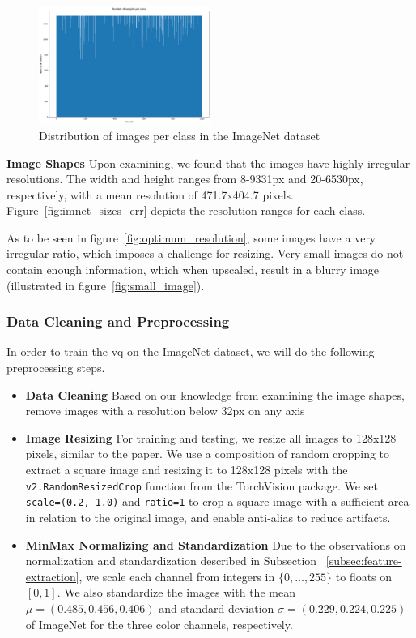 \begin{figure}[ht]
    \centering
    \includegraphics[width=0.5\textwidth]{../../sample_images/imagenet_dist}
    \caption{Distribution of images per class in the ImageNet dataset}
    \label{fig:imnet_dist}
\end{figure}

\textbf{Image Shapes}
Upon examining, we found that the images have highly irregular resolutions.
The width and height ranges from 8-9331px and 20-6530px, respectively, with a mean resolution of 471.7x404.7 pixels.
Figure~\ref{fig:imnet_sizes_err} depicts the resolution ranges for each class.

As to be seen in figure~\ref{fig:optimum_resolution}, some images have a very irregular ratio, which imposes a challenge
for resizing.
Very small images do not contain enough information, which when upscaled, result in a blurry image (illustrated in
figure~\ref{fig:small_image}).

\subsubsection{Data Cleaning and Preprocessing}
In order to train the \ac{vq} on the ImageNet dataset, we will do the following preprocessing steps.

\begin{itemize}
    \item \textbf{Data Cleaning}
    Based on our knowledge from examining the image shapes, remove images with a resolution below 32px on any axis
    \item \textbf{Image Resizing}
    For training and testing, we resize all images to 128x128 pixels, similar to the paper.
    We use a composition of random cropping to extract a square image and resizing it to 128x128 pixels with
    the \texttt{v2.RandomResizedCrop} function from the TorchVision package.
    We set \texttt{scale=(0.2, 1.0)} and \texttt{ratio=1} to crop a square image with a sufficient area in
    relation to the original image, and enable anti-alias to reduce artifacts.
    \item \textbf{MinMax Normalizing and Standardization}
    Due to the observations on normalization and standardization described in Subsection
    ~\ref{subsec:feature-extraction}, we scale each channel from integers in $\{0,\dots,255\}$ to floats on
    $[0,1]$.
    We also standardize the images with the mean $\mu = (0.485, 0.456, 0.406)$ and standard deviation
    $\sigma = (0.229, 0.224, 0.225)$ of ImageNet for the three color channels, respectively.
\end{itemize}

